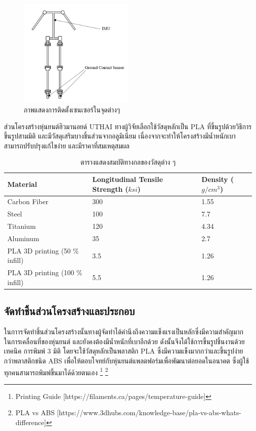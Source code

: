 \begin{figure}[ht]
    \centering
    \includegraphics[width=0.5\textwidth]{chapter3/images/uthai_sensor.PNG}
    \caption{ภาพแสดงการติดตั้งเซนเซอร์ในจุดต่างๆ}
    \label{fig:uthai_structure2}
\end{figure}

ส่วนโครงสร้างหุ่นยนต์ฮิวมานอยด์ UTHAI ทางผู้วิจัยเลือกใช้วัสดุหลักเป็น PLA ที่ขึ้นรูปด้วยวิธีการขึ้นรูปสามมิติ
และมีวัสดุเสริมบางชิ้นส่วนจากอลูมิเนียม เนื่องจากจะทำให้โครงสร้างมีน้ำหนักเบา สามารถปรับปรุงแก้ไขง่าย และมีราคาที่สมเหตุสมผล
\begin{table}[ht]
	\centering
	\begin{tabular}{| l | l | l |}
		\hline
		Material & Longitudinal Tensile Strength ($ksi$) & Density ($g/cm^3$) \\
        \hline
        Carbon Fiber & 300 & 1.55 \\
        Steel & 100	& 7.7 \\
        Titanium & 120 & 4.34 \\
        Aluminum & 35 & 2.7 \\
        PLA 3D printing (50 \% infill) & 3.5 & 1.26 \\
        PLA 3D printing (100 \% infill) & 5.5 & 1.26 \\
	    \hline
	\end{tabular}
	\caption{ตารางแสดงสมบัติทางกลของวัสดุต่าง ๆ}
	\label{tab:material_properties}
\end{table}

\clearpage
\subsection{จัดทำชิ้นส่วนโครงสร้างและประกอบ}
ในกาารจัดทำชิ้นส่วนโครงสร้างนั้นทางผู้จัดทำได้คำนึงถึงความแข็งแรงเป็นหลักซึ่งมีความสำคัญมาก
ในการเคลื่อนที่ของหุ่นยนต์ และยังคงต้องมีน้ำหนักที่เบาอีกด้วย ดังนั้นจึงได้ใช้การขึ้นรูปชิ้นงานด้วยเทคนิค
การพิมพ์ 3 มิติ โดยจะใช้วัสดุหลักเป็นพลาสติก PLA ซึ่งมีความแข็งมากกว่าและขึ้นรูปง่ายกว่าพลาสติกชนิด ABS
เพื่อให้ตอบโจทย์กับหุ่นยนต์แพลตฟอร์มเพื่อพัฒนาต่อยอดในอนาคต ซึ่งผู้ใช้ทุกคนสามารถพิมพ์ขึ้นมาได้ด้วยตนเอง
\footnote{ Printing Guide [https://filaments.ca/pages/temperature-guide]}
\footnote{ PLA vs ABS [https://www.3dhubs.com/knowledge-base/pla-vs-abs-whats-difference]}

